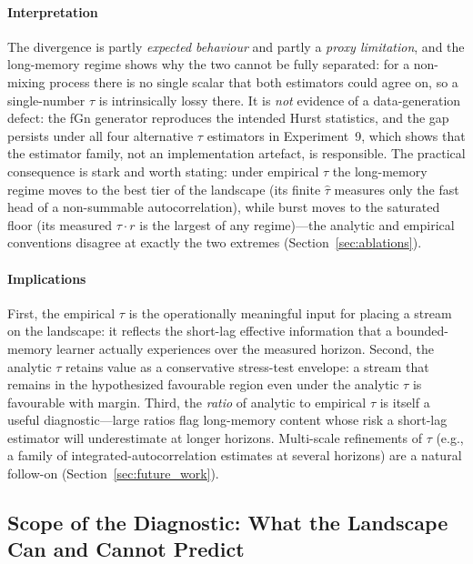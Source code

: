 \documentclass[sensors,article,submit,pdftex,moreauthors]{Definitions/mdpi}
\providecommand{\DIFadd}[1]{{\protect\color{blue}#1}} %
\providecommand{\DIFaddbegin}{} %
\providecommand{\DIFaddend}{} %
\begin{document}
\paragraph{\DIFadd{Interpretation}} \DIFadd{The divergence is partly }\emph{\DIFadd{expected behaviour}} \DIFadd{and partly a }\emph{\DIFadd{proxy limitation}}\DIFadd{, and the long-memory regime shows why the two cannot be fully separated: for a non-mixing process there is no single scalar that both estimators could agree on, so a single-number $\tau$ is intrinsically lossy there. It is }\emph{\DIFadd{not}} \DIFadd{evidence of a data-generation defect: the fGn generator reproduces the intended Hurst statistics, and the gap persists under all four alternative $\tau$ estimators in Experiment~9, which shows that the estimator family, not an implementation artefact, is responsible. The practical consequence is stark and worth stating: under empirical $\tau$ }\DIFaddend the \DIFaddbegin \DIFadd{long-memory regime moves to the best tier of the landscape (its finite $\hat{\tau}$ measures only the fast head of a non-summable autocorrelation), while burst moves to the saturated floor (its measured $\tau \cdot r$ is the largest of any regime)---the analytic and empirical conventions disagree at exactly the two extremes (Section~\ref{sec:ablations}).
}

\paragraph{\DIFadd{Implications}} \DIFadd{First, the empirical $\tau$ is the operationally meaningful input for placing a stream on the landscape: it reflects the short-lag effective information that a bounded-memory learner actually experiences over the measured horizon. Second, the analytic $\tau$ retains value as a conservative stress-test envelope: a stream that remains in the hypothesized favourable region even under the analytic $\tau$ is favourable with margin. Third, the }\emph{\DIFadd{ratio}} \DIFadd{of analytic to empirical $\tau$ is itself a useful diagnostic---large ratios flag long-memory content whose risk a short-lag estimator will underestimate at longer horizons. Multi-scale refinements of $\tau$ (e.g., a family of integrated-autocorrelation estimates at several horizons) are a natural follow-on (Section~\ref{sec:future_work}).
}

\subsection{\DIFadd{Scope of the Diagnostic: What the Landscape Can and Cannot Predict}}
\label{sec:scope_diag}
\end{document}
